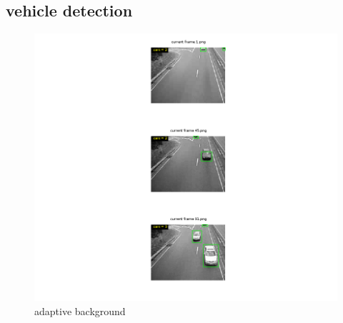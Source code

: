 \documentclass{article}
\begin{document}
	\subsection{vehicle detection}
	\begin{figure}[H]
		\includegraphics[width=\linewidth]{Q3/partC/partC.png}
		\caption{adaptive background}
	\end{figure}
	

	
	
	
	
	
	
\end{document}
